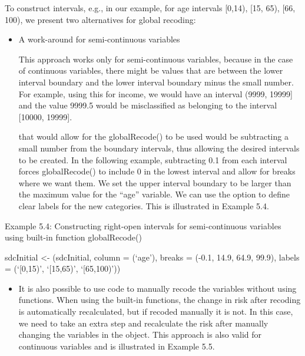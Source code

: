 \documentclass[letterpaper,10pt,english]{sphinxmanual}
\begin{document}
To construct  intervals, e.g., in our example, for age
intervals {[}0,14), {[}15, 65), {[}66, 100), we present two alternatives for
global recoding:
\begin{itemize}
\item {} 
A work-around for semi-continuous variables %
\begin{footnote}[3]\sphinxAtStartFootnote
This approach works only for semi-continuous variables, because in
the case of continuous variables, there might be values that are
between the lower interval boundary and the lower interval boundary
minus the small number. For example, using this for income, we would
have an interval (9999, 19999{]} and the value 9999.5 would be
misclassified as belonging to the interval {[}10000, 19999{]}.
%
\end{footnote}
that would allow for the globalRecode() to be used would be
subtracting a small number from the boundary intervals, thus allowing
the desired intervals to be created. In the following example,
subtracting 0.1 from each interval forces globalRecode() to include 0
in the lowest interval and allow for breaks where we want them. We
set the upper interval boundary to be larger than the maximum value
for the “age” variable. We can use the option  to define
clear labels for the new categories. This is illustrated in Example
5.4.

\end{itemize}

Example 5.4: Constructing right-open intervals for semi-continuous
variables using built-in  function globalRecode()

sdcInitial \textless{}- (sdcInitial, column = (‘age’),
breaks = (-0.1, 14.9, 64.9, 99.9), labels = (‘{[}0,15)’,
‘{[}15,65)’, ‘{[}65,100)’))
\begin{itemize}
\item {} 
It is also possible to use  code to manually recode the variables
without using  functions. When using the built-in
 functions, the change in risk after recoding is
automatically recalculated, but if recoded manually it is not. In
this case, we need to take an extra step and recalculate the risk
after manually changing the variables in the  object. This
approach is also valid for continuous variables and is illustrated in
Example 5.5.

\end{itemize}
\end{document}
